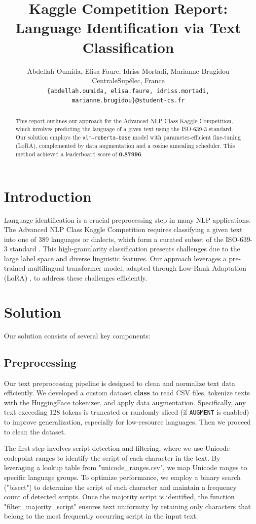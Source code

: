 \documentclass[11pt]{article}
\title{Kaggle Competition Report: Language Identification via Text Classification}
\author{
    Abdellah Oumida, Elisa Faure, Idriss Mortadi, Marianne Brugidou \\
    CentraleSupélec, France \\
    \texttt{\{abdellah.oumida, elisa.faure, idriss.mortadi, marianne.brugidou\}@student-cs.fr}
}
\begin{document}
\maketitle

\begin{abstract}
This report outlines our approach for the Advanced NLP Class Kaggle Competition, which involves predicting the language of a given text using the ISO-639-3 standard. Our solution employs the \texttt{xlm-roberta-base} model with parameter-efficient fine-tuning (LoRA), complemented by data augmentation and a cosine annealing scheduler. This method achieved a leaderboard score of \textbf{0.87996}.
\end{abstract}

\section{Introduction}
Language identification is a crucial preprocessing step in many NLP applications. The Advanced NLP Class Kaggle Competition requires classifying a given text into one of 389 languages or dialects, which form a curated subset of the ISO-639-3 standard \citep{iso639-3}. This high-granularity classification presents challenges due to the large label space and diverse linguistic features. Our approach leverages a pre-trained multilingual transformer model, adapted through Low-Rank Adaptation (LoRA) \citep{hu2022lora}, to address these challenges efficiently.

\section{Solution}
Our solution consists of several key components:
\subsection{Preprocessing}
Our text preprocessing pipeline is designed to clean and normalize text data efficiently.
We developed a custom dataset \textbf{class} to read CSV files, tokenize texts with the HuggingFace tokenizer, and apply data augmentation. Specifically, any text exceeding 128 tokens is truncated or randomly sliced (if \texttt{AUGMENT} is enabled) to improve generalization, especially for low-resource languages. Then we proceed to clean the dataset.

The first step involves script detection and filtering, where we use Unicode codepoint ranges to identify the script of each character in the text. By leveraging a lookup table from "unicode\_ranges.csv", we map Unicode ranges to specific language groups. To optimize performance, we employ a binary search ("bisect") to determine the script of each character and maintain a frequency count of detected scripts. Once the majority script is identified, the function "filter\_majority\_script" ensures text uniformity by retaining only characters that belong to the most frequently occurring script in the input text.  
\end{document}
